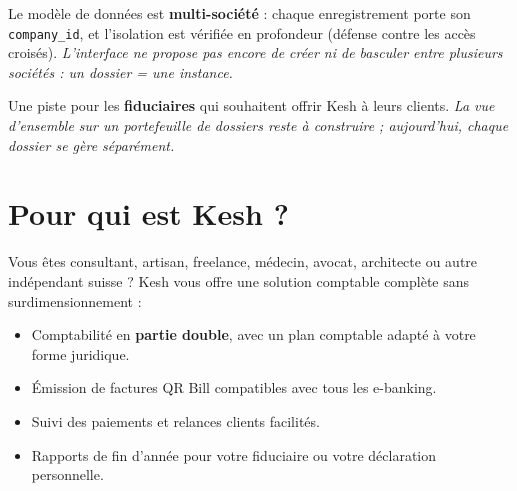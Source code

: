 \documentclass[a4paper,11pt,oneside]{article}
\begin{document}
\vspace{0.3cm}

\begin{tcolorbox}[%
    enhanced, breakable,
    colback=keshSurfaceAlt, colframe=keshPrimaryLight,
    boxrule=0pt, leftrule=4pt, arc=4pt,
    title=\sffamily\bfseries\color{keshPrimaryLight}{\faUsers\ Fiduciaires : une instance par dossier}
]
\sffamily
Le modèle de données est \textbf{multi-société} : chaque enregistrement porte son \texttt{company\_id}, et l'isolation est vérifiée en profondeur (défense contre les accès croisés). \emph{L'interface ne propose pas encore de créer ni de basculer entre plusieurs sociétés : un dossier = une instance.}

Une piste pour les \textbf{fiduciaires} qui souhaitent offrir Kesh à leurs clients. \emph{La vue d'ensemble sur un portefeuille de dossiers reste à construire ; aujourd'hui, chaque dossier se gère séparément.}
\end{tcolorbox}


\clearpage

\section*{\color{keshPrimary}Pour qui est Kesh ?}

\vspace{0.5cm}

\begin{tcolorbox}[%
    enhanced, breakable,
    colback=white, colframe=keshBorder,
    boxrule=0.5pt, arc=4pt%
]
\sffamily

\textbf{\large\color{keshPrimary}{\faUserTie\ Indépendant ou entreprise individuelle}}

\vspace{0.3cm}

Vous êtes consultant, artisan, freelance, médecin, avocat, architecte ou autre indépendant suisse ? Kesh vous offre une solution comptable complète sans surdimensionnement :

\begin{itemize}
    \item Comptabilité en \textbf{partie double}, avec un plan comptable adapté à votre forme juridique.
    \item Émission de factures QR Bill compatibles avec tous les e-banking.
    \item Suivi des paiements et relances clients facilités.
    \item Rapports de fin d'année pour votre fiduciaire ou votre déclaration personnelle.
\end{itemize}

\end{tcolorbox}
\end{document}
